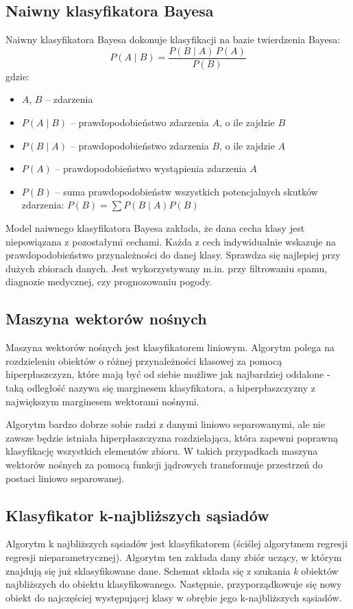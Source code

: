 \documentclass{classrep}
\begin{document}
\subsection{Naiwny klasyfikatora Bayesa}
Naiwny klasyfikatora Bayesa dokonuje klasyfikacji na bazie twierdzenia Bayesa:
$$ P(A \mid B) = \frac{P(B \mid A) \, P(A)}{P(B)} $$
gdzie:
\begin{itemize}
    \item $A$, $B$ -- zdarzenia
    \item $P(A \mid B)$ -- prawdopodobieństwo zdarzenia $A$, o ile zajdzie $B$
    \item $P(B \mid A)$ -- prawdopodobieństwo zdarzenia $B$, o ile zajdzie $A$
    \item $P(A)$ -- prawdopodobieństwo wystąpienia zdarzenia $A$
    \item $P(B)$ -- suma prawdopodobieństw wszystkich potencjalnych skutków zdarzenia: $P(B)=\sum P(B\mid A)P(B)$
\end{itemize}

Model naiwnego klasyfikatora Bayesa zakłada, że dana cecha klasy jest niepowiązana z pozostałymi cechami. Każda z cech indywidualnie wskazuje na prawdopodobieństwo przynależności do danej klasy.
Sprawdza się najlepiej przy dużych zbiorach danych. Jest wykorzystywany m.in. przy filtrowaniu spamu, diagnozie medycznej, czy prognozowaniu pogody.

\subsection{Maszyna wektorów nośnych}
Maszyna wektorów nośnych jest klasyfikatorem liniowym. Algorytm polega na rozdzieleniu obiektów o różnej przynależności klasowej za pomocą hiperpłaszczyzn, które mają być od siebie możliwe jak najbardziej oddalone - taką odległość nazywa się marginesem klasyfikatora, a hiperpłaszczyzny z największym marginesem wektorami nośnymi. 

Algorytm bardzo dobrze sobie radzi z danymi liniowo separowanymi, ale nie zawsze będzie istniała hiperpłaszczyzna rozdzielająca, która zapewni poprawną klasyfikację wszystkich elementów zbioru. W takich przypadkach maszyna wektorów nośnych za pomocą funkcji jądrowych transformuje przestrzeń do postaci liniowo separowanej.

\subsection{Klasyfikator k-najbliższych sąsiadów}
Algorytm k najbliższych sąsiadów jest klasyfikatorem (ściślej algorytmem regresji regresji nieparametrycznej). Algorytm ten zakłada dany zbiór uczący, w którym znajdują się już sklasyfikowane dane. Schemat składa się z szukania \textit{k} obiektów najbliższych do obiektu klasyfikowanego. Następnie, przyporządkowuje się nowy obiekt do najczęściej występującej klasy w obrębie jego k-najbliższych sąsiadów.\\
\end{document}
